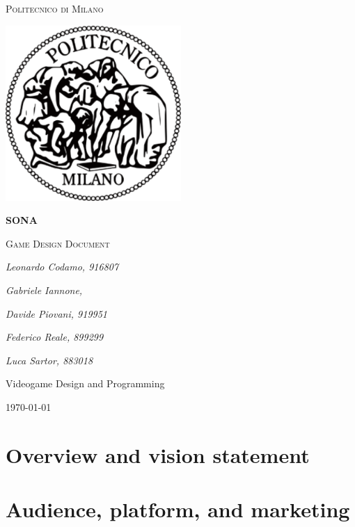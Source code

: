 \documentclass[15pt, a4paperm, hidelinks]{article}
\begin{document}
	\begin{titlepage}
	\centering
	{\scshape\huge Politecnico di Milano\par}
	\vspace{1.5cm}
	\includegraphics[width=0.50\textwidth]{Images/logoFronte.pdf}\par
	\vspace{1.5cm}
	{\Huge\bfseries SONA\par}
	\vspace{0.5cm}
	{\scshape\LARGE Game Design Document\par}
	\vspace{2cm}
	{\LARGE\itshape Leonardo Codamo, 916807\par}
	{\LARGE\itshape Gabriele Iannone, \par}
	{\LARGE\itshape Davide Piovani, 919951\par}
	{\LARGE\itshape Federico Reale, 899299\par}
	{\LARGE\itshape Luca Sartor, 883018\par}
	\vfill \vfill
	{\Large Videogame Design and Programming\par}
	\vfill
	{\large \today\par}
\end{titlepage}

\tableofcontents
\clearpage

\section{Overview and vision statement}


\bigskip

\section{Audience, platform, and marketing}

\clearpage
\end{document}
